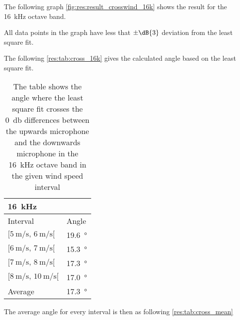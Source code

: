  The following graph \autoref{fig:res:result_crosswind_16k} shows the result for the \SI{16}{\kilo\hertz} octave band. 
 

 All data points in the graph have less that $\pm \dB{3}$ deviation from the least square fit.
 
 The following \autoref{res:tab:cross_16k} gives the calculated angle based on the least square fit.  
  
 \begin{table}[H]
 \centering
  \caption{The table shows the angle where the least square fit crosses the \SI{0}{\decibel} differences between the upwards microphone and the downwards microphone in the \SI{16}{\kilo\hertz} octave band in the given wind speed interval}
\begin{tabular}{l|l}
\multicolumn{2}{l}{\SI{16}{\kilo\hertz}}      \\ \hline
Interval & Angle \\ \hline
  $[\SI{5}{\meter\per\second},\, \SI{6}{\meter\per\second}[ $       &   \SI{19.6}{\degree}    \\
    $[\SI{6}{\meter\per\second},\, \SI{7}{\meter\per\second}[ $     &   \SI{15.3}{\degree}     \\
  $[\SI{7}{\meter\per\second},\, \SI{8}{\meter\per\second}[ $       &    \SI{17.3}{\degree}    \\
   $[\SI{8}{\meter\per\second},\, \SI{10}{\meter\per\second}[ $      &     \SI{17.0}{\degree}  \\ \hline
    Average      &     \SI{17.3}{\degree} 
\end{tabular}
\label{res:tab:cross_16k}
\end{table}    
 
 
The average angle for every interval is then as following \autoref{res:tab:cross_mean}


